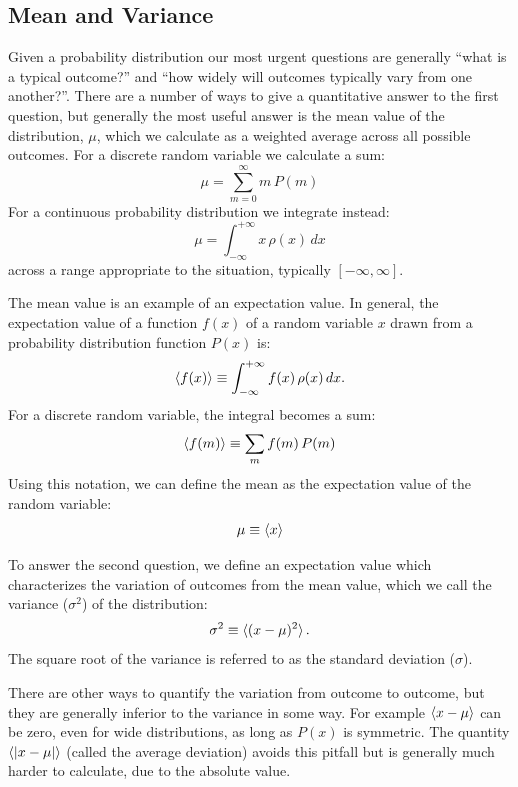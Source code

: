 \documentclass[12pt]{book}
\begin{document}
\subsection{Mean and Variance}

Given a probability distribution our most urgent questions are generally ``what is a
typical outcome?'' and ``how widely will outcomes typically vary from
one another?''.  There are a number of ways to give a quantitative answer to the first question,
but generally the most useful answer is the mean value of the
distribution, $\mu$, which we calculate as a weighted average across
all possible outcomes.  For a discrete random variable we calculate a sum:
\begin{equation}
\label{eqn:mudis}
\mu = \sum_{m=0}^{\infty} m \, P(m)
\end{equation}
For a continuous probability distribution we integrate instead:
\begin{equation}
\mu = \int_{-\infty}^{+\infty} x \, \rho(x) \, dx 
\end{equation}
across a range appropriate to the situation, typically $[-\infty,\infty]$.

The mean value is an example of an expectation value.  In general, the
expectation value of a function $f(x)$ of a random variable $x$ drawn
from a probability distribution function $P(x)$ is:
\begin{displaymath}
\braket{f(x)} \equiv \int_{-\infty}^{+\infty} f(x) \, \rho(x) \,dx.
\end{displaymath}
For a discrete random variable, the integral becomes a sum:
\begin{displaymath}
\braket{f(m)} \equiv \sum_m f(m) \, P(m) 
\end{displaymath}
Using this notation, we can define the mean as the expectation value of the random variable:
\begin{displaymath}
\mu \equiv \braket{x}
\end{displaymath}

To answer the second question, we define an expectation value
which characterizes the variation of outcomes from the mean value,
which we call the variance ($\sigma^2$) of the distribution:
\begin{displaymath}
\sigma^2 \equiv \braket{(x-\mu)^2}.
\end{displaymath}
The square root of the variance is referred to as the
standard deviation ($\sigma$).

There are other ways to quantify the variation from outcome to
outcome, but they are generally inferior to the variance in some way.
For example $\braket{x-\mu}$ can be zero, even for wide distributions,
as long as $P(x)$ is symmetric.  The quantity $\braket{|x-\mu|}$
(called the average deviation) avoids this pitfall but is generally
much harder to calculate, due to the absolute value.
\end{document}
